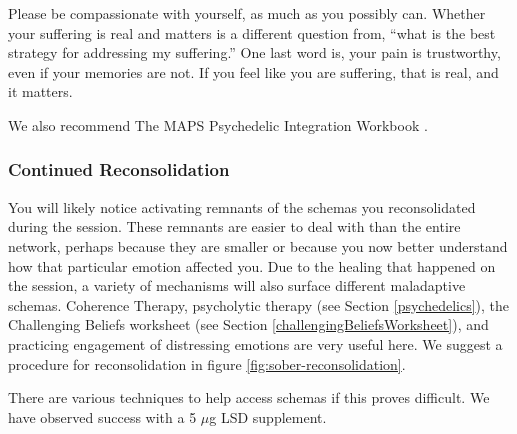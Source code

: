 \documentclass[12pt,letterpaper]{article}
\begin{document}
Please be compassionate with yourself, as much as you possibly can. Whether your suffering is real and matters is a different question from, “what is the best strategy for addressing my suffering.” One last word is, your pain is trustworthy, even if your memories are not. If you feel like you are suffering, that is real, and it matters.

We also recommend The MAPS Psychedelic Integration Workbook \cite{integrationHandbook}.
\subsubsection{Continued Reconsolidation}
\label{sec:reconsolidation}
You will likely notice activating remnants of the schemas you reconsolidated during the session. These remnants are easier to deal with than the entire network, perhaps because they are smaller or because you now better understand how that particular emotion affected you. Due to the healing that happened on the session, a variety of mechanisms will also surface different maladaptive schemas. Coherence Therapy, psycholytic therapy (see Section \ref{psychedelics}), the Challenging Beliefs worksheet (see Section \ref{challengingBeliefsWorksheet}), and practicing engagement of distressing emotions are very useful here. We suggest a procedure for reconsolidation in figure \ref{fig:sober-reconsolidation}.

There are various techniques to help access schemas if this proves difficult. We have observed success with a 5 $\mu$g LSD supplement. 


\end{document}
